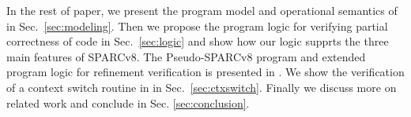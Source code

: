 

In the rest of paper,
we present the program model
and operational semantics of \sparc{} in Sec.~\ref{sec:modeling}.
Then we propose the program logic for verifying 
partial correctness of \sparc{} code in Sec.~\ref{sec:logic} and show 
how our logic supprts the three main features of SPARCv8.
The Pseudo-SPARCv8 program and extended 
program logic for refinement verification is 
presented in \Sec{\ref{sec:refine-verification-sparc}}. 
We show the verification of a context switch routine 
in \sparc{} in Sec.~\ref{sec:ctxswitch}. 
Finally we discuss more on
related work and conclude in Sec. \ref{sec:conclusion}.
